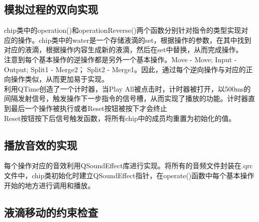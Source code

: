 \documentclass[12pt, a4paper]{article}
\begin{document}
		\subsection{模拟过程的双向实现}
			chip类中的operation()和operationReverse()两个函数分别针对指令的类型实现对应的操作。chip类中的water是一个存储液滴的set，根据操作的参数，在其中找到对应的液滴，根据操作内容生成新的液滴，然后在set中替换，从而完成操作。\\ \hspace*{0.8cm}
			注意到每个基本操作的逆操作都是另外一个基本操作。Move - Move; Input - Output; Split1 - Merge2； Split2 - Merge1。因此，通过每个逆向操作与对应的正向操作类似，从而更加易于实现。\\ \hspace*{0.8cm}
			利用QTime创造了一个计时器，当Play All被点击时，计时器被打开，以500ms的间隔发射信号，触发操作下一步指令的信号槽，从而实现了播放的功能。计时器直到最后一个操作被执行或者Reset按钮被按下才会终止 \\ \hspace*{0.8cm}
			Reset按钮按下后信号触发函数，将所有chip中的成员均重置为初始化的值。
		\subsection{播放音效的实现}
			每个操作对应的音效利用QSoundEffect库进行实现。将所有的音频文件封装在.qrc文件中，chip类初始化时建立QSoundEffect指针，在operate()函数中每个基本操作开始的地方进行调用和播放。
		\subsection{液滴移动的约束检查}
			
\end{document}
